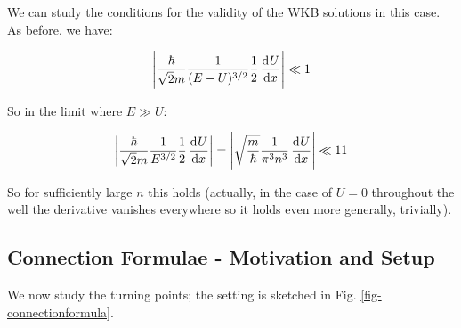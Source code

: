 We can study the conditions for the validity of the WKB solutions in this case. As before, we have:

\begin{equation}
    \left|\frac{\hbar}{\sqrt{2}m}\frac{1}{(E - U)^{3/2}}\frac{1}{2}\dod{U}{x}\right| \ll 1
\end{equation}

So in the limit where $E \gg U$:

\begin{equation}
    \left|\frac{\hbar}{\sqrt{2}m}\frac{1}{E^{3/2}}\frac{1}{2}\dod{U}{x}\right| = \left|\sqrt{\frac{m}{\hbar}}\frac{1}{\pi^3n^3}\dod{U}{x}\right| \ll 11
\end{equation}

So for sufficiently large $n$ this holds (actually, in the case of $U = 0$ throughout the well the derivative vanishes everywhere so it holds even more generally, trivially).


\subsection{Connection Formulae - Motivation and Setup}
We now study the turning points; the setting is sketched in Fig. \ref{fig-connectionformula}.

